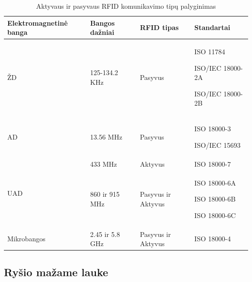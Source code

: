 \begin{table}[!ht]
    \centering
    \renewcommand{\arraystretch}{1,2}
    \begin{tabular}{m{10em}m{10em}m{10em}m{10em}} 
        \hline
        Elektromagnetinė banga            & Bangos dažniai    & RFID tipas    &Standartai   \\ 
        \hline
        ŽD                     & 125-134.2 KHz & Pasyvus & ISO 11784 \par ISO/IEC 18000-2A \par ISO/IEC 18000-2B   \\ 
        \hline
        AD                     & 13.56 MHz & Pasyvus  &  ISO 18000-3 \par ISO/IEC 15693 \\ 
        \hline
        \multirow{2}{*}{UAD} & 433 MHz       & Aktyvus   &  ISO 18000-7    \\ 
        \cline{2-4}
                                & 860 ir 915 MHz      &  Pasyvus ir Aktyvus  &  ISO 18000-6A \par ISO 18000-6B \par ISO 18000-6C    \\ 
        \hline
        Mikrobangos                       & 2.45 ir 5.8 GHz         & Pasyvus ir Aktyvus &  ISO 18000-4  \\
        \hline
    \end{tabular}
    \caption{Aktyvaus ir pasyvaus RFID komunikavimo tipų palyginimas}
\end{table}

\subsection{Ryšio mažame lauke}
